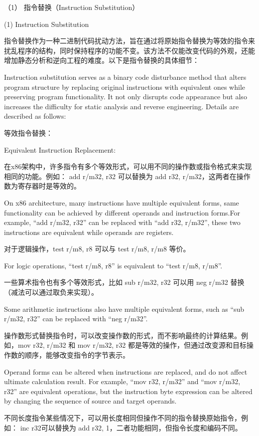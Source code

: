 （1） 指令替换（Instruction Substitution）

(1) Instruction Substitution

指令替换作为一种二进制代码扰动方法，旨在通过将原始指令替换为等效的指令来扰乱程序的结构，同时保持程序的功能不变。该方法不仅能改变代码的外观，还能增加静态分析和逆向工程的难度。以下是指令替换的具体细节：

Instruction substitution serves as a binary code disturbance method that alters program structure by replacing original instructions with equivalent ones while preserving program functionality. It not only disrupts code appearance but also increases the difficulty for static analysis and reverse engineering. Details are described as follows:

等效指令替换：

Equivalent Instruction Replacement:

在x86架构中，许多指令有多个等效形式，可以用不同的操作数或指令格式来实现相同的功能。例如：
add r/m32, r32 可以替换为 add r32, r/m32，这两者在操作数为寄存器时是等效的。

On x86 architecture, many instructions have multiple equivalent forms, same functionality can be achieved by different operands and instruction forms.For example, “add r/m32, r32” can be replaced with “add r32, r/m32”, these two instructions are equivalent while operands are registers.

对于逻辑操作，test r/m8, r8 可以与 test r/m8, r/m8 等价。

For logic operations, “test r/m8, r8” is equivalent to “test r/m8, r/m8”.

一些算术指令也有多个等效形式，比如 sub r/m32, r32 可以用 neg r/m32 替换（减法可以通过取负来实现）。

Some arithmetic instructions also have multiple equivalent forms, such as “sub r/m32, r32” can be replaced with “neg r/m32”.

操作数形式替换指令时，可以改变操作数的形式，而不影响最终的计算结果。例如，mov r32, r/m32 和 mov r/m32, r32 都是等效的操作，但通过改变源和目标操作数的顺序，能够改变指令的字节表示。

Operand forms can be altered when instructions are replaced, and do not affect ultimate calculation result. For example, “mov r32, r/m32” and “mov r/m32, r32” are equivalent operations, but the instruction byte expression can be altered by changing the sequence of source and target operands.

不同长度指令某些情况下，可以用长度相同但操作不同的指令替换原始指令，例如：
inc r32可以替换为 add r32, 1，二者功能相同，但指令长度和编码不同。

